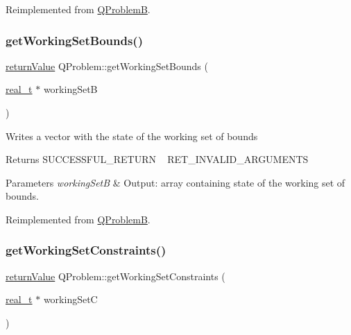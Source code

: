 Reimplemented from \hyperlink{class_q_problem_b_a29c4cdd661701580f1ebe1e78804bd43}{Q\+ProblemB}.

\mbox{\label{class_q_problem_a23949497794759135cd63d2bc5dc297a}} 
\subsubsection{\texorpdfstring{get\+Working\+Set\+Bounds()}{getWorkingSetBounds()}}
{\footnotesize\ttfamily \hyperlink{_message_handling_8hpp_a81d556f613bfbabd0b1f9488c0fa865e}{return\+Value} Q\+Problem\+::get\+Working\+Set\+Bounds (\begin{DoxyParamCaption}\item[{\hyperlink{qp_o_a_s_e_s__wrapper_8h_a0d00e2b3dfadee81331bbb39068570c4}{real\+\_\+t} $\ast$}]{working\+SetB }\end{DoxyParamCaption})\hspace{0.3cm}{\ttfamily [virtual]}}

Writes a vector with the state of the working set of bounds \begin{DoxyReturn}{Returns}
S\+U\+C\+C\+E\+S\+S\+F\+U\+L\+\_\+\+R\+E\+T\+U\+RN ~\newline
 R\+E\+T\+\_\+\+I\+N\+V\+A\+L\+I\+D\+\_\+\+A\+R\+G\+U\+M\+E\+N\+TS 
\end{DoxyReturn}

\begin{DoxyParams}{Parameters}
{\em working\+SetB} & Output\+: array containing state of the working set of bounds. \\
\hline
\end{DoxyParams}


Reimplemented from \hyperlink{class_q_problem_b_a317183ae1f862863ac5b50e0c4028227}{Q\+ProblemB}.

\mbox{\label{class_q_problem_a9aff2accd586086d0a3113eba9b73678}} 
\subsubsection{\texorpdfstring{get\+Working\+Set\+Constraints()}{getWorkingSetConstraints()}}
{\footnotesize\ttfamily \hyperlink{_message_handling_8hpp_a81d556f613bfbabd0b1f9488c0fa865e}{return\+Value} Q\+Problem\+::get\+Working\+Set\+Constraints (\begin{DoxyParamCaption}\item[{\hyperlink{qp_o_a_s_e_s__wrapper_8h_a0d00e2b3dfadee81331bbb39068570c4}{real\+\_\+t} $\ast$}]{working\+SetC }\end{DoxyParamCaption})\hspace{0.3cm}{\ttfamily [virtual]}}

